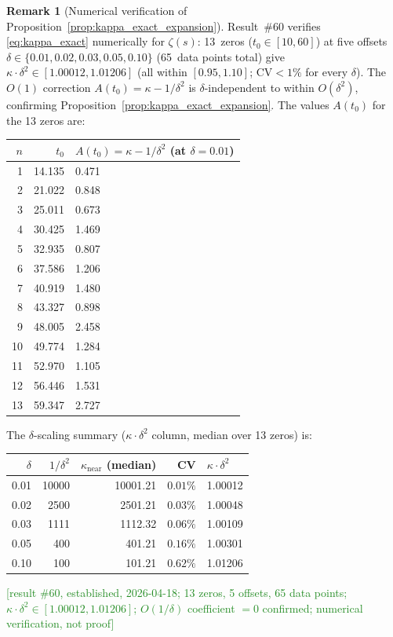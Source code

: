 \documentclass[11pt, a4paper]{article}
\theoremstyle{definition}
\newtheorem{remark}{Remark}[section]
\theoremstyle{plain}
\begin{document}
\begin{remark}[Numerical verification of Proposition~\ref{prop:kappa_exact_expansion}]
\label{rem:kappa_scaling_numerical}
Result~\#60 verifies \eqref{eq:kappa_exact} numerically for $\zeta(s)$:
13~zeros ($t_0 \in [10,60]$) at five offsets $\delta \in \{0.01, 0.02, 0.03, 0.05, 0.10\}$
(65~data points total) give $\kappa\cdot\delta^2 \in [1.00012, 1.01206]$
(all within $[0.95, 1.10]$; CV${<}1\%$ for every $\delta$).
The $O(1)$ correction $A(t_0) = \kappa - 1/\delta^2$ is $\delta$-independent to within $O(\delta^2)$,
confirming Proposition~\ref{prop:kappa_exact_expansion}.
The values $A(t_0)$ for the 13 zeros are:
\medskip
\begin{center}
\small
\begin{tabular}{@{}rrl@{}}
\toprule
$n$ & $t_0$ & $A(t_0) = \kappa{-}1/\delta^2$ (at $\delta{=}0.01$) \\
\midrule
1  & 14.135 & 0.471 \\
2  & 21.022 & 0.848 \\
3  & 25.011 & 0.673 \\
4  & 30.425 & 1.469 \\
5  & 32.935 & 0.807 \\
6  & 37.586 & 1.206 \\
7  & 40.919 & 1.480 \\
8  & 43.327 & 0.898 \\
9  & 48.005 & 2.458 \\
10 & 49.774 & 1.284 \\
11 & 52.970 & 1.105 \\
12 & 56.446 & 1.531 \\
13 & 59.347 & 2.727 \\
\bottomrule
\end{tabular}
\end{center}
\medskip\noindent
The $\delta$-scaling summary ($\kappa\cdot\delta^2$ column, median over 13 zeros) is:

\smallskip
\begin{center}
\small
\begin{tabular}{@{}rrrrl@{}}
\toprule
$\delta$ & $1/\delta^2$ & $\kappa_{\mathrm{near}}$ (median) & CV & $\kappa\cdot\delta^2$ \\
\midrule
0.01 & 10000 & 10001.21 & $0.01\%$ & 1.00012 \\
0.02 &  2500 &  2501.21 & $0.03\%$ & 1.00048 \\
0.03 &  1111 &  1112.32 & $0.06\%$ & 1.00109 \\
0.05 &   400 &   401.21 & $0.16\%$ & 1.00301 \\
0.10 &   100 &   101.21 & $0.62\%$ & 1.01206 \\
\bottomrule
\end{tabular}
\end{center}
\smallskip\noindent
\textcolor{ForestGreen}{[result \#60, established, 2026-04-18; 13 zeros, 5 offsets, 65 data points;
$\kappa\cdot\delta^2 \in [1.00012, 1.01206]$; $O(1/\delta)$ coefficient $= 0$ confirmed; numerical verification, not proof]}
\end{remark}
\end{document}
